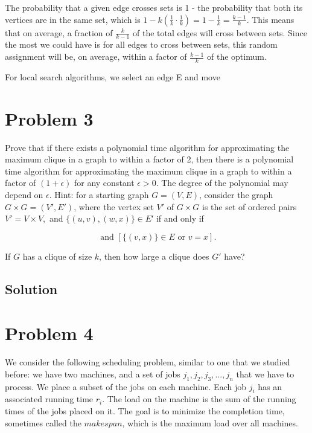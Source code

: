 \documentclass[11pt]{article}
\begin{document}
The probability that a given edge crosses sets is 1 - the probability that both its vertices are in the same set, which is $1- k(\frac{1}{k}\cdot\frac{1}{k})= 1 - \frac{1}{k} = \frac{k-1}{k}$. This means that on average, a fraction of $\frac{k}{k-1}$ of the total edges will cross between sets. Since the most we could have is for all edges to cross between sets, this random assignment will be, on average, within a factor of $\frac{k-1}{k}$ of the optimum.

For local search algorithms, we select an edge E and move 
\section{Problem 3}
Prove that if there exists a polynomial time algorithm for approximating the maximum clique in a graph to within a factor of 2, then there is a polynomial time algorithm for approximating the maximum clique in a graph to within a factor of $(1 + \epsilon)$ for any constant $\epsilon > 0$. The degree of the polynomial may depend on $\epsilon$. Hint: for a starting graph $G = (V,E)$, consider the graph $G \times G = (V′,E′)$, where the vertex set $V′$ of $G \times G$ is the set of ordered pairs $V′ = V \times V,$ and $\{(u,v),(w,x)\} \in E$′ if and only if

\begin{equation}
[\{(u,w)\}\in E \text{ or } u=w] \text{ and } [\{(v,x)\}\in E \text{ or } v=x].			
\end{equation}

If $G$ has a clique of size $k$, then how large a clique does $G′$ have?

\subsection{Solution}

\section{Problem 4}

We consider the following scheduling problem, similar to one that we studied before: we have two machines, and a set of jobs $j_1, j_2, j_3,..., j_n$ that we have to process. We place a subset of the jobs on each machine. Each job $j_i$ has an associated running time $r_i$. The load on the machine is the sum of the running times of the jobs placed on it. The goal is to minimize the completion time, sometimes called the $makespan$, which is the maximum load over all machines.
\end{document}
